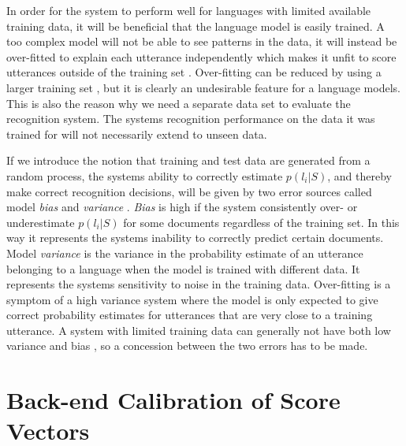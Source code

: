 In order for the system to perform well for languages with limited available training data, it will be beneficial that the language model is easily trained. A too complex model will not be able to see patterns in the data, it will instead be over-fitted to explain each utterance independently which makes it unfit to score utterances outside of the training set \cite[311]{information}. Over-fitting can be reduced by using a larger training set \cite[147]{machinelearningbook}, but it is clearly an undesirable feature for a language models. This is also the reason why we need a separate data set to evaluate the recognition system. The systems recognition performance on the data it was trained for will not necessarily extend to unseen data.

If we introduce the notion that training and test data are generated from a random process, the systems ability to correctly estimate $p(l_i | S)$, and thereby make correct recognition decisions, will be given by two error sources called model \emph{bias} and \emph{variance} \cite[149]{machinelearningbook}. \emph{Bias} is high if the system consistently over- or underestimate $p(l_i | S)$ for some documents regardless of the training set. In this way it represents the systems inability to correctly predict certain documents. Model \emph{variance} is the variance in the probability estimate of an utterance belonging to a language when the model is trained with different data. It represents the systems sensitivity to noise in the training data. Over-fitting is a symptom of a high variance system where the model is only expected to give correct probability estimates for utterances that are very close to a training utterance. A system with limited training data can generally not have both low variance and bias \cite[312]{information}, so a concession between the two errors has to be made.


\section{Back-end Calibration of Score Vectors}
\label{sect:backendscoring}

